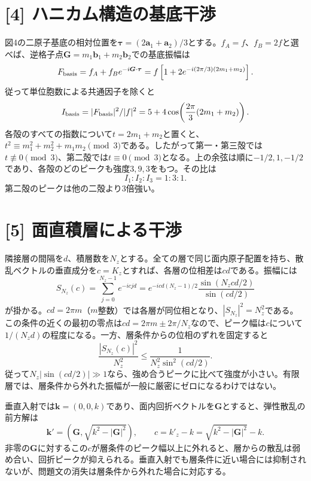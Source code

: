 \documentclass[11pt,a4paper]{article}
\begin{document}
\section*{[4] ハニカム構造の基底干渉}
図4の二原子基底の相対位置を$\boldsymbol\tau=(2\boldsymbol a_1+\boldsymbol a_2)/3$とする。$f_A=f$、$f_B=2f$と選べば、逆格子点$\boldsymbol G=m_1\boldsymbol b_1+m_2\boldsymbol b_2$での基底振幅は
\begin{equation}
 F_{\rm basis}=f_A+f_Be^{-i\boldsymbol G\cdot\boldsymbol\tau}
 =f\left[1+2e^{-i(2\pi/3)(2m_1+m_2)}\right].
\end{equation}
従って単位胞数による共通因子を除くと
\begin{equation}
 I_{\rm basis}=|F_{\rm basis}|^2/|f|^2
 =5+4\cos\!\left(\frac{2\pi}{3}(2m_1+m_2)\right).
\end{equation}
各殻のすべての指数について$t=2m_1+m_2$と置くと、$t^2\equiv m_1^2+m_2^2+m_1m_2\pmod 3$である。したがって第一・第三殻では$t\not\equiv0\pmod3$、第二殻では$t\equiv0\pmod3$となる。上の余弦は順に$-1/2,1,-1/2$であり、各殻のどのピークも強度$3,9,3$をもつ。その比は
\begin{equation}
 \boxed{I_1:I_2:I_3=1:3:1}.
\end{equation}
第二殻のピークは他の二殻より3倍強い。

\section*{[5] 面直積層による干渉}
隣接層の間隔を$d$、積層数を$N_z$とする。全ての層で同じ面内原子配置を持ち、散乱ベクトルの垂直成分を$c=K_z$とすれば、各層の位相差は$cd$である。振幅には
\begin{equation}
 S_{N_z}(c)=\sum_{j=0}^{N_z-1}e^{-icjd}
 =e^{-icd(N_z-1)/2}\frac{\sin(N_zcd/2)}{\sin(cd/2)}
\end{equation}
が掛かる。$cd=2\pi m$（$m$整数）では各層が同位相となり、$|S_{N_z}|^2=N_z^2$である。この条件の近くの最初の零点は$cd=2\pi m\pm2\pi/N_z$なので、ピーク幅は$c$について$1/(N_zd)$の程度になる。一方、層条件からの位相のずれを固定すると
\begin{equation}
 \frac{|S_{N_z}(c)|^2}{N_z^2}
 \leq \frac{1}{N_z^2\sin^2(cd/2)}.
\end{equation}
従って$N_z|\sin(cd/2)|\gg1$なら、強め合うピークに比べて強度が小さい。有限層では、層条件から外れた振幅が一般に厳密にゼロになるわけではない。

垂直入射では$\boldsymbol k=(0,0,k)$であり、面内回折ベクトルを$\boldsymbol G$とすると、弾性散乱の前方解は
\begin{equation}
 \boldsymbol k'=(\boldsymbol G,\sqrt{k^2-|\boldsymbol G|^2}),\qquad
 c=k'_z-k=\sqrt{k^2-|\boldsymbol G|^2}-k.
\end{equation}
非零の$\boldsymbol G$に対するこの$c$が層条件のピーク幅以上に外れると、層からの散乱は弱め合い、回折ピークが抑えられる。垂直入射でも層条件に近い場合には抑制されないが、問題文の消失は層条件から外れた場合に対応する。
\end{document}
